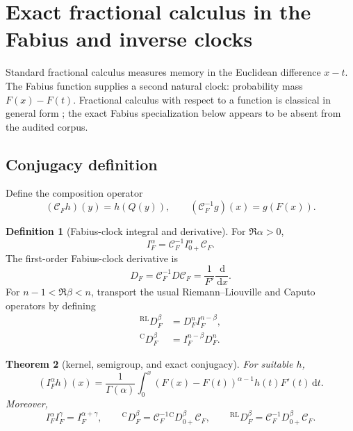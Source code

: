 \documentclass[11pt,oneside]{article}
\numberwithin{equation}{section}
\theoremstyle{plain}
\newtheorem{theorem}{Theorem}[section]
\theoremstyle{definition}
\newtheorem{definition}[theorem]{Definition}
\theoremstyle{remark}
\newcommand{\dd}{\,\mathrm d}
\newcommand{\Ccap}{\mathrm C}
\begin{document}
\section{Exact fractional calculus in the Fabius and inverse clocks}
\label{sec:F-clock}

Standard fractional calculus measures memory in the Euclidean difference
$x-t$.  The Fabius function supplies a second natural clock: probability mass
$F(x)-F(t)$.  Fractional calculus with respect to a function is classical in
general form \cite{Oumarou2021}; the exact Fabius specialization below appears
to be absent from the audited corpus.

\subsection{Conjugacy definition}

Define the composition operator
\begin{equation}
 (\mathcal C_Fh)(y)=h(Q(y)),
 \qquad
 (\mathcal C_F^{-1}g)(x)=g(F(x)).
 \label{eq:CF}
\end{equation}

\begin{definition}[Fabius-clock integral and derivative]
For $\Re\alpha>0$,
\begin{equation}
 I_F^\alpha=\mathcal C_F^{-1}I_{0+}^\alpha\mathcal C_F.
 \label{eq:IF-conjugacy}
\end{equation}
The first-order Fabius-clock derivative is
\begin{equation}
 D_F=\mathcal C_F^{-1}D\mathcal C_F
 =\frac1{F'}\frac{\dd}{\dd x}.
 \label{eq:DF-conjugacy}
\end{equation}
For $n-1<\Re\beta<n$, transport the usual Riemann--Liouville and Caputo
operators \cite{Caputo1967,Podlubny} by defining
\begin{align}
 {}^{\mathrm{RL}}D_F^\beta
 &=D_F^nI_F^{n-\beta},
 \label{eq:RL-DF}\\
 {}^{\Ccap}D_F^\beta
 &=I_F^{n-\beta}D_F^n.
 \label{eq:Caputo-DF}
\end{align}
\end{definition}

\begin{theorem}[kernel, semigroup, and exact conjugacy]
For suitable $h$,
\begin{equation}
 (I_F^\alpha h)(x)
 =\frac1{\Gamma(\alpha)}
 \int_0^x(F(x)-F(t))^{\alpha-1}h(t)F'(t)\dd t.
 \label{eq:IF-kernel}
\end{equation}
Moreover,
\begin{equation}
 I_F^\alpha I_F^\gamma=I_F^{\alpha+\gamma},
 \qquad
 {}^{\Ccap}D_F^\beta
 =\mathcal C_F^{-1}{}^{\Ccap}D_{0+}^\beta\mathcal C_F,
 \qquad
 {}^{\mathrm{RL}}D_F^\beta
 =\mathcal C_F^{-1}D_{0+}^\beta\mathcal C_F.
 \label{eq:F-clock-conjugacies}
\end{equation}
\end{theorem}
\end{document}
